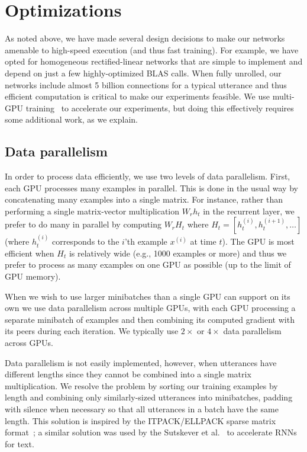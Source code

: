\section{Optimizations}
\label{sec:deepspeech:optimization}

As noted above, we have made several design decisions to make our networks
amenable to high-speed execution (and thus fast training). For example, we have
opted for homogeneous rectified-linear networks that are simple to implement
and depend on just a few highly-optimized BLAS calls. When fully unrolled, our
networks include almost 5 billion connections for a typical utterance and thus
efficient computation is critical to make our experiments feasible. We use
multi-GPU training~\cite{coates2013cotshpc, krizhevsky2012imagenet} to
accelerate our experiments, but doing this effectively requires some additional
work, as we explain.

\subsection{Data parallelism}
\label{sec:deepspeech:datapar}

In order to process data efficiently, we use two levels of data parallelism.
First, each GPU processes many examples in parallel. This is done in the usual
way by concatenating many examples into a single matrix. For instance, rather
than performing a single matrix-vector multiplication $W_r h_t$ in the
recurrent layer, we prefer to do many in parallel by computing $W_r H_t$ where
$H_t = [ h^{(i)}_{t}, h^{(i+1)}_{t}, \ldots ]$ (where $h_t^{(i)}$ corresponds
to the $i$'th example $x^{(i)}$ at time $t$). The GPU is most efficient when
$H_t$ is relatively wide (e.g., 1000 examples or more) and thus we prefer to
process as many examples on one GPU as possible (up to the limit of GPU
memory).

When we wish to use larger minibatches than a single GPU can support on its own
we use data parallelism across multiple GPUs, with each GPU processing a
separate minibatch of examples and then combining its computed gradient with
its peers during each iteration. We typically use $2\times$ or $4\times$ data
parallelism across GPUs.

Data parallelism is not easily implemented, however, when utterances have
different lengths since they cannot be combined into a single matrix
multiplication. We resolve the problem by sorting our training examples by
length and combining only similarly-sized utterances into minibatches, padding
with silence when necessary so that all utterances in a batch have the same
length. This solution is inspired by the ITPACK/ELLPACK sparse matrix
format~\cite{kincaid1989}; a similar solution was used by the Sutskever et
al.~\cite{sutskever2014} to accelerate RNNs for text.

